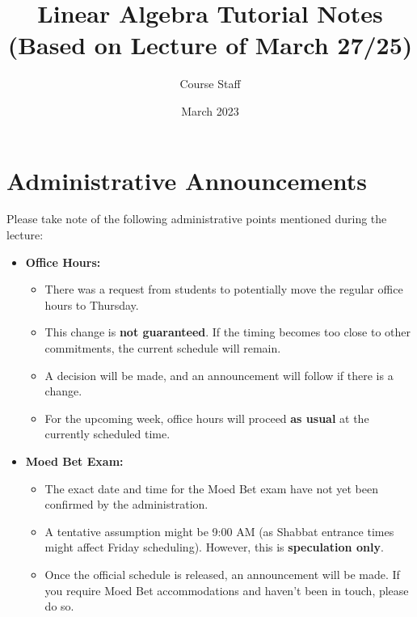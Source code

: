 \documentclass[11pt]{article}
\title{Linear Algebra Tutorial Notes \\ (Based on Lecture of March 27/25)}
\author{Course Staff}
\date{March 2023} %
\theoremstyle{definition}
\theoremstyle{remark}
\begin{document}
\maketitle

\section*{Administrative Announcements}

Please take note of the following administrative points mentioned during the lecture:

\begin{itemize}
    \item \textbf{Office Hours:}
        \begin{itemize}
            \item There was a request from students to potentially move the regular office hours to Thursday.
            \item This change is \textbf{not guaranteed}. If the timing becomes too close to other commitments, the current schedule will remain.
            \item A decision will be made, and an announcement will follow if there is a change.
            \item For the upcoming week, office hours will proceed \textbf{as usual} at the currently scheduled time.
        \end{itemize}

    \item \textbf{Moed Bet Exam:}
        \begin{itemize}
            \item The exact date and time for the Moed Bet exam have not yet been confirmed by the administration.
            \item A tentative assumption might be 9:00 AM (as Shabbat entrance times might affect Friday scheduling). However, this is \textbf{speculation only}.
            \item Once the official schedule is released, an announcement will be made. If you require Moed Bet accommodations and haven't been in touch, please do so.
        \end{itemize}


\end{itemize}
\end{document}
